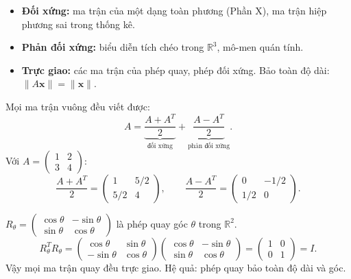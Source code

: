 \documentclass[12pt,a4paper]{article}
\begin{document}
\begin{ynghia}
\begin{itemize}
  \item \textbf{Đối xứng:} ma trận của một dạng toàn phương (Phần X), ma trận hiệp phương sai trong thống kê.
  \item \textbf{Phản đối xứng:} biểu diễn tích chéo trong $\mathbb{R}^3$, mô-men quán tính.
  \item \textbf{Trực giao:} các ma trận của phép quay, phép đối xứng. Bảo toàn độ dài: $\|A\mathbf{x}\| = \|\mathbf{x}\|$.
\end{itemize}
\end{ynghia}

\begin{vidu}[title={Phân tích thành đối xứng + phản đối xứng}]
Mọi ma trận vuông đều viết được:
\[
  A = \underbrace{\dfrac{A + A^T}{2}}_{\text{đối xứng}} + \underbrace{\dfrac{A - A^T}{2}}_{\text{phản đối xứng}}.
\]
Với $A = \begin{pmatrix}1 & 2\\ 3 & 4\end{pmatrix}$:
\[
  \dfrac{A+A^T}{2} = \begin{pmatrix}1 & 5/2\\ 5/2 & 4\end{pmatrix},\qquad \dfrac{A-A^T}{2} = \begin{pmatrix}0 & -1/2\\ 1/2 & 0\end{pmatrix}.
\]
\end{vidu}

\begin{vidu}[title={Ma trận quay -- một ma trận trực giao quan trọng}]
$R_\theta = \begin{pmatrix}\cos\theta & -\sin\theta \\ \sin\theta & \cos\theta\end{pmatrix}$ là phép quay góc $\theta$ trong $\mathbb{R}^2$.
\[
  R_\theta^T R_\theta = \begin{pmatrix}\cos\theta & \sin\theta\\ -\sin\theta & \cos\theta\end{pmatrix}\begin{pmatrix}\cos\theta & -\sin\theta\\ \sin\theta & \cos\theta\end{pmatrix} = \begin{pmatrix}1 & 0\\ 0 & 1\end{pmatrix} = I.
\]
Vậy mọi ma trận quay đều trực giao. Hệ quả: phép quay bảo toàn độ dài và góc.
\end{vidu}
\end{document}

